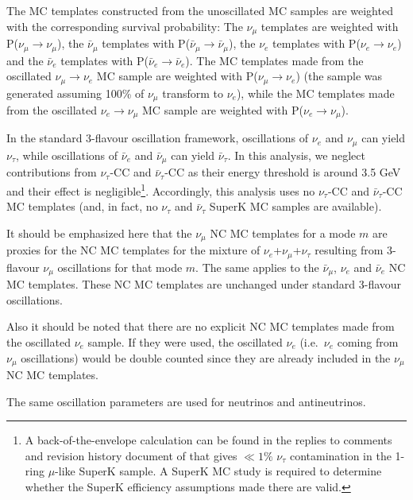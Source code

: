 The MC templates constructed from the unoscillated MC samples are weighted 
with the corresponding survival probability:
The $\nu_{\mu}$ templates are weighted with P($\nu_{\mu}\rightarrow\nu_{\mu}$),
the $\bar{\nu}_{\mu}$ templates with P($\bar{\nu}_{\mu}\rightarrow\bar{\nu}_{\mu}$),
the $\nu_{e}$ templates with P($\nu_{e}\rightarrow\nu_{e}$) and
the $\bar{\nu}_{e}$ templates with P($\bar{\nu}_{e}\rightarrow\bar{\nu}_{e}$).
The MC templates made from the oscillated $\nu_{\mu} \rightarrow \nu_{e}$ MC sample are weighted with 
P($\nu_{\mu}\rightarrow\nu_{e}$) (the sample was generated assuming 100\% of 
$\nu_{\mu}$ transform to $\nu_{e}$), 
while the MC templates made from the oscillated  $\nu_{e} \rightarrow \nu_{\mu}$ MC sample are weighted with
P($\nu_{e}\rightarrow\nu_{\mu}$).

In the standard 3-flavour oscillation framework,
oscillations of $\nu_{e}$ and $\nu_{\mu}$ can yield $\nu_{\tau}$, while
oscillations of $\bar{\nu}_{e}$ and $\bar{\nu}_{\mu}$ can yield $\bar{\nu}_{\tau}$.
In this analysis, we neglect contributions from $\nu_{\tau}$-CC and $\bar{\nu}_{\tau}$-CC as their
energy threshold is around 3.5 GeV and their effect is negligible\footnote{
A back-of-the-envelope calculation can be found in the replies to
comments and revision history document of
\cite{OurRun123DisappAnalysis3Flavour} that gives $\ll 1\%$ $\nu_\tau$
contamination in the 1-ring $\mu$-like SuperK sample. A SuperK MC study is required
to determine whether the SuperK efficiency assumptions made there are valid.
  }.
Accordingly, this analysis uses no $\nu_{\tau}$-CC and $\bar{\nu}_{\tau}$-CC MC templates
(and, in fact, no $\nu_{\tau}$ and $\bar{\nu}_{\tau}$ SuperK MC samples are available).

It should be emphasized here that
the $\nu_{\mu}$ NC MC templates for a mode $m$ are proxies for the
NC MC templates for the mixture of $\nu_{e}$+$\nu_{\mu}$+$\nu_{\tau}$ resulting from
3-flavour $\nu_{\mu}$ oscillations for that mode $m$. The same applies to the $\bar{\nu}_{\mu}$, $\nu_{e}$ and $\bar{\nu}_{e}$ NC MC templates.
These NC MC templates are unchanged under standard 3-flavour oscillations.%

Also it should be noted that there are no explicit NC MC templates made from the oscillated $\nu_{e}$ sample.
If they were used, the oscillated $\nu_{e}$ (i.e.\ $\nu_{e}$ coming from $\nu_{\mu}$ oscillations) would be double counted
since they are already included in the $\nu_{\mu}$ NC MC templates.

The same oscillation parameters are used for neutrinos and antineutrinos.

